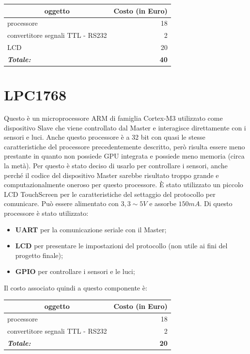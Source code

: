 \documentclass[a4paper,titlepage]{book}
\newcommand{\itema}{\begin{itemize}[noitemsep,topsep=10pt,parsep=5pt,partopsep=10pt]}
\begin{document}
\begin{tabular}{|l  r|}
\hline
\multicolumn{1}{|c|}{\textbf {oggetto}} & \multicolumn{1}{c|}{\textbf {Costo (in Euro)}} \\
\hline

processore 				& 18 \\
convertitore segnali TTL - RS232 	&  2  \\
LCD 					& 20 \\
\hline
\hline

\textit{\textbf{Totale:}}		& \textbf{40} \\

\hline
\end{tabular}
 

\section{LPC1768}



Questo è un microprocessore ARM di famiglia Cortex-M3 utilizzato come dispositivo Slave che viene controllato dal Master e interagisce direttamente con i sensori e luci. Anche questo processore è a 32 bit con quasi le stesse caratteristiche del processore precedentemente descritto, però risulta essere meno prestante in quanto non possiede GPU integrata e possiede meno memoria (circa la metà). Per questo è stato deciso di usarlo per controllare i sensori, anche perché il codice del dispositivo Master sarebbe risultato troppo grande e computazionalmente oneroso per questo processore. È stato utilizzato un piccolo LCD TouchScreen per le caratteristiche del settaggio del protocollo per comunicare. Può essere alimentato con $3,3 \sim 5 V$ e assorbe $150 mA$. Di questo processore è stato utilizzato:

\itema

\item \textbf{UART} per la comunicazione seriale con il Master;
\item \textbf{LCD} per presentare le impostazioni del protocollo (non utile ai fini del progetto finale);
\item \textbf{GPIO} per controllare i sensori e le luci;
\end{itemize}

Il costo associato quindi a questo componente è:

\begin{tabular}{|l  r|}
\hline
\multicolumn{1}{|c|}{\textbf {oggetto}} & \multicolumn{1}{c|}{\textbf {Costo (in Euro)}} \\
\hline

processore 				& 18 \\
convertitore segnali TTL - RS232 	&  2  \\
\hline
\hline

\textit{\textbf{Totale:}}		& \textbf{20} \\

\hline
\end{tabular}
\end{document}
